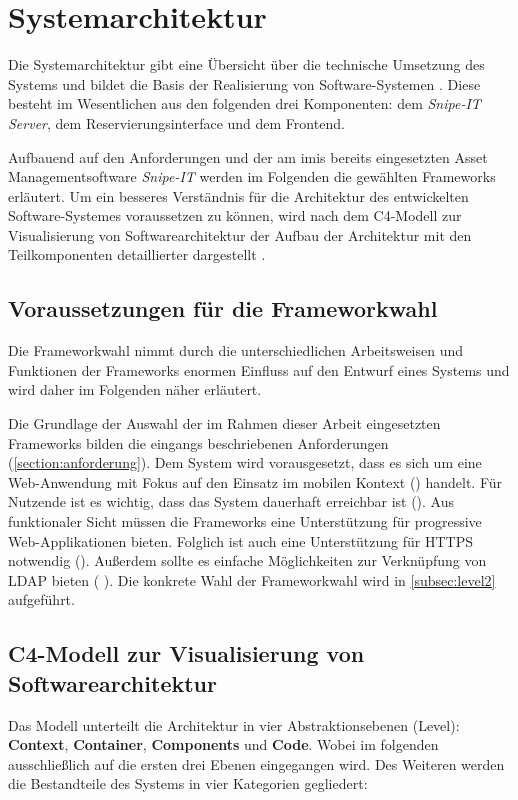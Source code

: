 \section{Systemarchitektur}
\label{section:architektur}
Die Systemarchitektur gibt eine Übersicht über die technische Umsetzung des
Systems und bildet die Basis der Realisierung von Software-Systemen
\cite{dumke_software-metriken_2000}. Diese besteht im Wesentlichen aus den
folgenden drei Komponenten: dem \textit{Snipe-IT Server}, dem
Reservierungsinterface und dem Frontend.

Aufbauend auf den Anforderungen und der am \ac{imis} bereits eingesetzten Asset Managementsoftware
\textit{Snipe-IT} werden im Folgenden die gewählten Frameworks erläutert. Um ein besseres
Verständnis für die Architektur des entwickelten Software-Systemes voraussetzen zu können, wird nach
dem C4-Modell zur Visualisierung von Softwarearchitektur der Aufbau der Architektur mit den
Teilkomponenten detaillierter dargestellt \cite{brown2013software}.

\subsection{Voraussetzungen für die Frameworkwahl}
\label{section:Frameworkwahl}
Die Frameworkwahl nimmt durch die unterschiedlichen Arbeitsweisen und Funktionen
der Frameworks enormen Einfluss auf den Entwurf eines Systems und wird daher im
Folgenden näher erläutert.

Die Grundlage der Auswahl der im Rahmen dieser Arbeit eingesetzten Frameworks bilden die eingangs
beschriebenen Anforderungen (\ref{section:anforderung}). Dem System wird vorausgesetzt, dass es sich
um eine Web-Anwendung mit Fokus auf den Einsatz im mobilen Kontext ()
handelt. Für Nutzende ist es wichtig, dass das System dauerhaft erreichbar ist (). Aus
funktionaler Sicht müssen die Frameworks eine Unterstützung für progressive Web-Applikationen
bieten. Folglich ist auch eine Unterstützung für HTTPS notwendig (). Außerdem sollte es
einfache Möglichkeiten zur Verknüpfung von LDAP bieten ( ). Die konkrete
Wahl der Frameworkwahl wird in \ref{subsec:level2} aufgeführt.

\subsection{C4-Modell zur Visualisierung von Softwarearchitektur}
Das Modell unterteilt die Architektur in vier Abstraktionsebenen (Level):
\textbf{Context}, \textbf{Container}, \textbf{Components} und \textbf{Code}.
Wobei im folgenden ausschließlich auf die ersten drei Ebenen eingegangen wird.
Des Weiteren werden die Bestandteile des Systems in vier Kategorien gegliedert:

